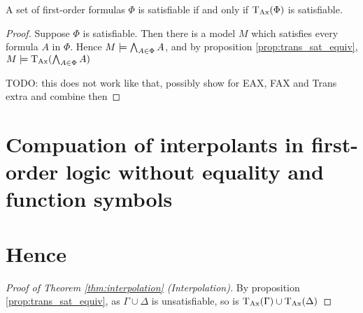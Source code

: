 \begin{corr}
	A set of first-order formulas $\Phi$ is satisfiable if and only if $\mathrm{T}_{\mathrm{Ax}}(\Phi)$ is satisfiable.
	\label{prop:trans_sat_equiv_set}
\end{corr}
\begin{proof}
	Suppose $\Phi$ is satisfiable. Then there is a model $M$ which satisfies every formula $A$ in $\Phi$.
	Hence $M \models \bigwedge_{A\in\Phi} A$, and by proposition \ref{prop:trans_sat_equiv}, $M \models \mathrm{T}_{\mathrm{Ax}}( \bigwedge_{A\in\Phi} A)$

	TODO: this does not work like that, possibly show for EAX, FAX and Trans extra and combine then
	\end{proof}



\section{Compuation of interpolants in first-order logic without equality and function symbols}


\section{Hence}

\begin{proof}[Proof of Theorem \ref{thm:interpolation} (Interpolation)]
	By proposition \ref{prop:trans_sat_equiv}, as $\Gamma \cup \Delta$ is unsatisfiable, so is $\mathrm{T}_{\mathrm{Ax}}(\Gamma) \cup \mathrm{T}_{\mathrm{Ax}}(\Delta)$
\end{proof}

